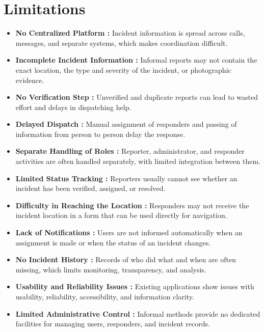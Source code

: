 \documentclass[a4paper,12pt]{report}
\begin{document}
	\section{Limitations}
	\begin{itemize}
		\item \textbf{No Centralized Platform :} Incident information is spread across calls, messages, and separate systems, which makes coordination difficult.
		
		\item \textbf{Incomplete Incident Information :} Informal reports may not contain the exact location, the type and severity of the incident, or photographic evidence.
		
		\item \textbf{No Verification Step :} Unverified and duplicate reports can lead to wasted effort and delays in dispatching help.
		
		\item \textbf{Delayed Dispatch :} Manual assignment of responders and passing of information from person to person delay the response.
		
		\item \textbf{Separate Handling of Roles :} Reporter, administrator, and responder activities are often handled separately, with limited integration between them.
		
		\item \textbf{Limited Status Tracking :} Reporters usually cannot see whether an incident has been verified, assigned, or resolved.
		
		\item \textbf{Difficulty in Reaching the Location :} Responders may not receive the incident location in a form that can be used directly for navigation.
		
		\item \textbf{Lack of Notifications :} Users are not informed automatically when an assignment is made or when the status of an incident changes.
		
		\item \textbf{No Incident History :} Records of who did what and when are often missing, which limits monitoring, transparency, and analysis.
		
		\item \textbf{Usability and Reliability Issues :} Existing applications show issues with usability, reliability, accessibility, and information clarity.
		
		\item \textbf{Limited Administrative Control :} Informal methods provide no dedicated facilities for managing users, responders, and incident records.
	\end{itemize}
	
\end{document}
